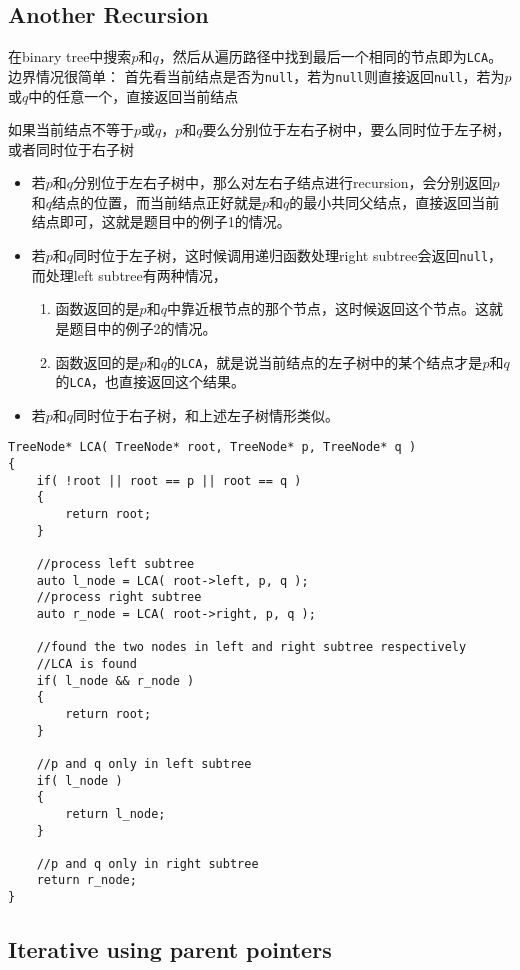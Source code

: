 \subsection{Another Recursion}
在binary tree中搜索$p$和$q$，然后从遍历路径中找到最后一个相同的节点即为\texttt{LCA}。边界情况很简单： 首先看当前结点是否为\texttt{null}，若为\texttt{null}则直接返回\texttt{null}，若为$p$或$q$中的任意一个，直接返回当前结点
\par
如果当前结点不等于$p$或$q$，$p$和$q$要么分别位于左右子树中，要么同时位于左子树，或者同时位于右子树
\begin{itemize}
\item 若$p$和$q$分别位于左右子树中，那么对左右子结点进行recursion，会分别返回$p$和$q$结点的位置，而当前结点正好就是$p$和$q$的最小共同父结点，直接返回当前结点即可，这就是题目中的例子1的情况。
\item 若$p$和$q$同时位于左子树，这时候调用递归函数处理right subtree会返回\texttt{null}， 而处理left subtree有两种情况，
\begin{enumerate}
\item 函数返回的是$p$和$q$中靠近根节点的那个节点，这时候返回这个节点。这就是题目中的例子2的情况。
\item 函数返回的是$p$和$q$的\texttt{LCA}，就是说当前结点的左子树中的某个结点才是$p$和$q$的\texttt{LCA}，也直接返回这个结果。
\end{enumerate}
\item 若$p$和$q$同时位于右子树，和上述左子树情形类似。
\end{itemize}

\begin{lstlisting}[style=customc, caption={Recursion Based On Left And Right Subtree}]
TreeNode* LCA( TreeNode* root, TreeNode* p, TreeNode* q )
{
    if( !root || root == p || root == q )
    {
        return root;
    }

    //process left subtree
    auto l_node = LCA( root->left, p, q );
    //process right subtree
    auto r_node = LCA( root->right, p, q );

    //found the two nodes in left and right subtree respectively
    //LCA is found
    if( l_node && r_node )
    {
        return root;
    }

    //p and q only in left subtree
    if( l_node )
    {
        return l_node;
    }

    //p and q only in right subtree
    return r_node;
}
\end{lstlisting}
\subsection{Iterative using parent pointers}

